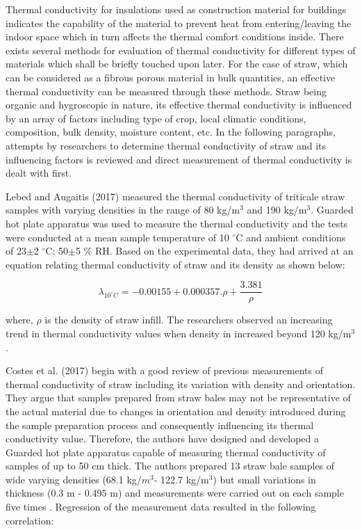 \documentclass[]{article}
\begin{document}
Thermal conductivity for insulations used as construction material for
buildings indicates the capability of the material to prevent heat from
entering/leaving the indoor space which in turn affects the thermal
comfort conditions inside. There exists several methods for evaluation
of thermal conductivity for different types of materials which shall be
briefly touched upon later. For the case of straw, which can be
considered as a fibrous porous material in bulk quantities, an effective
thermal conductivity can be measured through these methods. Straw being
organic and hygroscopic in nature, its effective thermal conductivity is
influenced by an array of factors including type of crop, local climatic
conditions, composition, bulk density, moisture content, etc. In the
following paragraphs, attempts by researchers to determine thermal
conductivity of straw and its influencing factors is reviewed and direct
measurement of thermal conductivity is dealt with first.

 Lebed and Augaitis (2017) measured the thermal conductivity of
triticale straw samples with varying densities in the range of 80
kg/m\(^{3}\) and 190 kg/m\( ^{3}\). Guarded hot plate apparatus was used
to measure the thermal conductivity and the tests were conducted at a
mean sample temperature of 10 \(^{\circ}\)C and ambient conditions of
23\(\pm\)2 \(^{\circ}\)C; 50\(\pm\)5 \% RH. Based on the experimental
data, they had arrived at an equation relating thermal conductivity of
straw and its density as shown below:

\[\lambda_{10^{\circ}C} = -0.00155 + 0.000357.\rho  + \frac{3.381}{\rho}\]

where, \(\rho\) is the density of straw infill. The researchers observed
an increasing trend in thermal conductivity values when density in
increased beyond 120 kg/m\(^{3}\).

 Costes et al. (2017) begin with a good review of previous measurements
of thermal conductivity of straw including its variation with density
and orientation. They argue that samples prepared from straw bales may
not be representative of the actual material due to changes in
orientation and density introduced during the sample preparation process
and consequently influencing its thermal conductivity value. Therefore,
the authors have designed and developed a Guarded hot plate apparatus
capable of measuring thermal conductivity of samples of up to 50 cm
thick. The authors prepared 13 straw bale samples of wide varying
densities (68.1 kg\(/m^{3}\)- 122.7 kg/m\(^{3}\)) but small variations
in thickness (0.3 m - 0.495 m) and measurements were carried out on each
sample five times . Regression of the measurement data resulted in the
following correlation:
\end{document}
